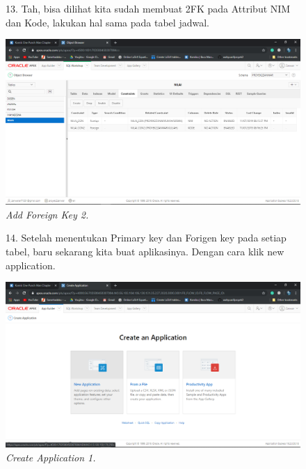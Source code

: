 \begin{enumerate}
    \begin{figure}[!htbp]
    \item[13.] Tah, bisa dilihat kita sudah membuat 2FK pada Attribut NIM dan Kode, lakukan hal sama pada tabel jadwal.
    \begin{center}
    \includegraphics[scale=0.3]{figures/Screenshot(131).png}
    \caption{\textit{Add Foreign Key 2.}}
    \end{center}   
    \end{figure}
    
    \begin{figure}[!htbp]
    \item[14.] Setelah menentukan Primary key dan Forigen key pada setiap tabel, baru sekarang kita buat aplikasinya. Dengan cara klik new application.
    \begin{center}
    \includegraphics[scale=0.3]{figures/Screenshot(132).png}
    \caption{\textit{Create Application 1.}}
    \end{center}   
    \end{figure}
    

\end{enumerate}
